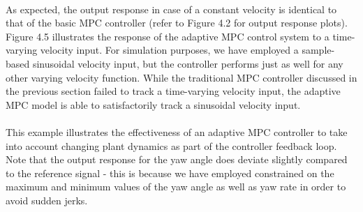 \paragraph{}
As expected, the output response in case of a constant velocity is identical to that of the basic MPC controller (refer to Figure 4.2 for output response plots). Figure 4.5 illustrates the response of the adaptive MPC control system to a time-varying velocity input. For simulation purposes, we have employed a sample-based sinusoidal velocity input, but the controller performs just as well for any other varying velocity function. While the traditional MPC controller discussed in the previous section failed to track a time-varying velocity input, the adaptive MPC model is able to satisfactorily track a sinusoidal velocity input. 

\paragraph{}
This example illustrates the effectiveness of an adaptive MPC controller to take into account changing plant dynamics as part of the controller feedback loop. Note that the output response for the yaw angle does deviate slightly compared to the reference signal - this is because we have employed constrained on the maximum and minimum values of the yaw angle as well as yaw rate in order to avoid sudden jerks.


